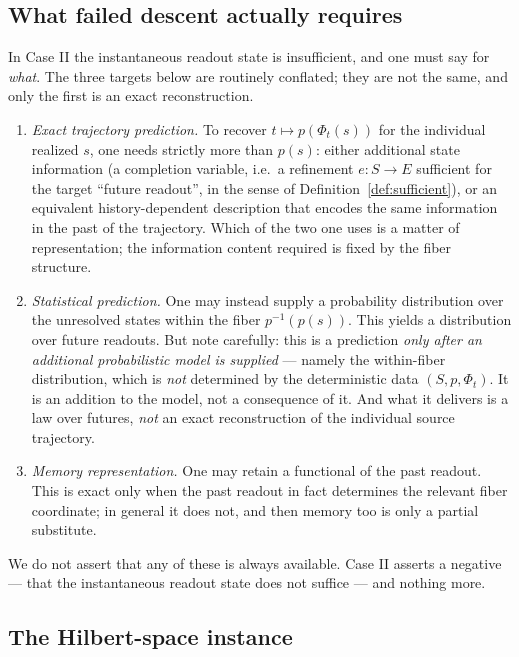 \documentclass[11pt,reqno]{amsart}
\theoremstyle{plain}
\theoremstyle{definition}
\theoremstyle{remark}
\begin{document}
\subsection{What failed descent actually requires}\label{subsec:faileddescent}

In Case II the instantaneous readout state is insufficient, and one must say for \emph{what}. The three targets below are routinely conflated; they are not the same, and only the first is an exact reconstruction.

\begin{enumerate}
\item \emph{Exact trajectory prediction.} To recover $t\mapsto p(\Phi_t(s))$ for the individual realized $s$, one needs strictly more than $p(s)$: either additional state information (a completion variable, i.e.\ a refinement $e\colon S\to E$ sufficient for the target ``future readout'', in the sense of Definition~\ref{def:sufficient}), or an equivalent history-dependent description that encodes the same information in the past of the trajectory. Which of the two one uses is a matter of representation; the information content required is fixed by the fiber structure.

\item \emph{Statistical prediction.} One may instead supply a probability distribution over the unresolved states within the fiber $p^{-1}(p(s))$. This yields a distribution over future readouts. But note carefully: this is a prediction \emph{only after an additional probabilistic model is supplied} --- namely the within-fiber distribution, which is \emph{not} determined by the deterministic data $(S,p,\Phi_t)$. It is an addition to the model, not a consequence of it. And what it delivers is a law over futures, \emph{not} an exact reconstruction of the individual source trajectory.

\item \emph{Memory representation.} One may retain a functional of the past readout. This is exact only when the past readout in fact determines the relevant fiber coordinate; in general it does not, and then memory too is only a partial substitute.
\end{enumerate}

We do not assert that any of these is always available. Case II asserts a negative --- that the instantaneous readout state does not suffice --- and nothing more.

\subsection{The Hilbert-space instance}\label{subsec:hilbert}
\end{document}
